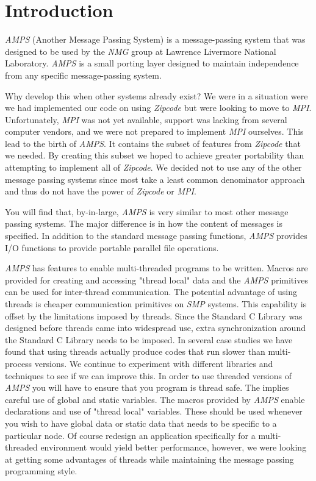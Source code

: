
\chapter{Introduction}
\label{Introduction}

{\em AMPS} (Another Message Passing System) is a message-passing system
that was designed to be used by the {\em NMG} group at Lawrence
Livermore National Laboratory.  {\em AMPS} is a small porting layer
designed to maintain independence from any specific message-passing
system.

Why develop this when other systems already exist?  We were in a
situation were we had implemented our code on using {\em Zipcode} 
\cite{SkLe90,skjellum.smith.ea.93,smith.falgout.ea.93} but
were looking to move to {\em MPI}.  Unfortunately, {\em MPI} was not
yet available, support was lacking from several computer vendors, and we
were not prepared to implement {\em MPI} ourselves.  This lead to the
birth of {\em AMPS}.  It contains the subset of features from
{\em Zipcode} that we needed.  By creating this subset we hoped to
achieve greater portability than attempting to implement all of
{\em Zipcode}.  We decided not to use any of the other message passing
systems since most take a least common denominator approach and thus do
not have the power of {\em Zipcode} or {\em MPI}.

You will find that, by-in-large, {\em AMPS} is very similar to most
other message passing systems.  The major difference is in how the
content of messages is specified.  In addition to the standard message
passing functions, {\em AMPS} provides I/O functions to provide
portable parallel file operations. 

{\em AMPS} has features to enable multi-threaded programs to be
written.  Macros are provided for creating and accessing "thread local"
data and the {\em AMPS} primitives can be used for inter-thread
communication.  The potential advantage of using threads is cheaper
communication primitives on {\em SMP} systems.  This capability is
offset by the limitations imposed by threads.  Since the Standard C
Library was designed before threads came into widespread use, extra
synchronization around the Standard C Library needs to be imposed.  In
several case studies we have found that using threads actually produce
codes that run slower than multi-process versions.  We continue to
experiment with different libraries and techniques to see if we can
improve this.  In order to use threaded versions of {\em AMPS} you will
have to ensure that you program is thread safe.  The implies careful
use of global and static variables.  The macros provided by {\em AMPS} 
enable declarations and use of "thread local" variables.  These should
be used whenever you wish to have global data or static data that needs
to be specific to a particular node.  Of course redesign an application
specifically for a multi-threaded environment would yield better
performance, however, we were looking at getting some advantages of
threads while maintaining the message passing programming style.

